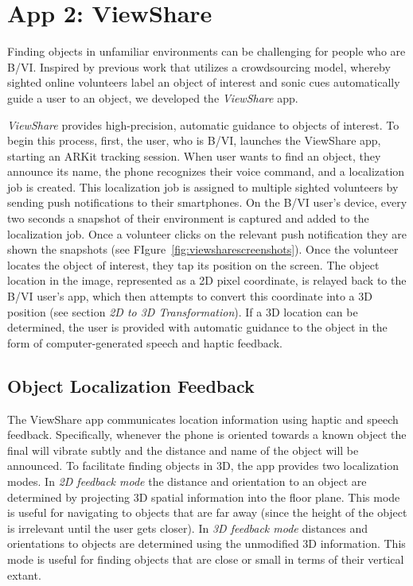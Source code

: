 \documentclass[chi_draft]{sigchi}
\newcommand{\BVI}{B/VI\xspace}
\begin{document}
\section{App 2: ViewShare}

Finding objects in unfamiliar environments can be challenging for people who are \BVI.  Inspired by previous work \cite{bigham2010vizwizlocateit} that utilizes a crowdsourcing model, whereby sighted online volunteers label an object of interest and sonic cues automatically guide a user to an object, we developed the \emph{ViewShare} app.

\emph{ViewShare} provides high-precision, automatic guidance to objects of interest.  To begin this process, first, the user, who is \BVI, launches the ViewShare app, starting an ARKit tracking session.  When  user wants to find an object, they announce its name, the phone recognizes their voice command, and a localization job is created.  This localization job is assigned to multiple sighted volunteers by sending push notifications to their smartphones.  On the \BVI user's device, every two seconds a snapshot of their environment is captured and added to the localization job.  Once a volunteer clicks on the relevant push notification they are shown the snapshots (see FIgure~\ref{fig:viewsharescreenshots}).  Once the volunteer locates the object of interest, they tap its position on the screen.  The object location in the image, represented as a 2D pixel coordinate, is relayed back to the \BVI user's app, which then attempts to convert this coordinate into a 3D position (see section \emph{2D to 3D Transformation}).  If a 3D location can be determined, the user is provided with automatic guidance to the object in the form of computer-generated speech and haptic feedback.

\subsection{Object Localization Feedback}
The ViewShare app communicates location information using haptic and speech feedback.  Specifically, whenever the phone is oriented towards a known object the final will vibrate subtly and the distance and name of the object will be announced.  To facilitate finding objects in 3D, the app provides two localization modes.  In \emph{2D feedback mode} the distance and orientation to an object are determined by projecting 3D spatial information into the floor plane.  This mode is useful for navigating to objects that are far away (since the height of the object is irrelevant until the user gets closer).  In \emph{3D feedback mode} distances and orientations to objects are determined using the unmodified 3D information.  This mode is useful for finding objects that are close or small in terms of their vertical extant.%
\end{document}
